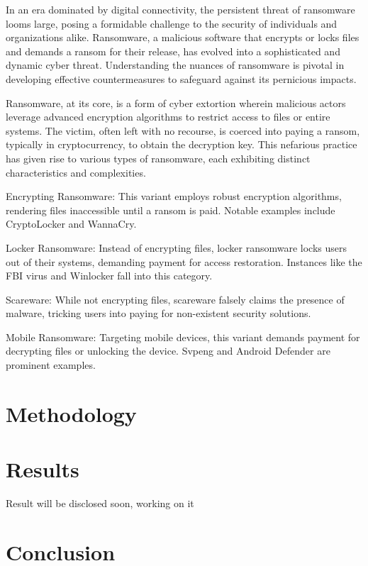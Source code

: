 \documentclass[12pt,twocolumn]{article}
\begin{document}
    In an era dominated by digital connectivity, the persistent threat of ransomware looms large, posing a formidable challenge to the security of individuals and organizations alike. Ransomware, a malicious software that encrypts or locks files and demands a ransom for their release, has evolved into a sophisticated and dynamic cyber threat. Understanding the nuances of ransomware is pivotal in developing effective countermeasures to safeguard against its pernicious impacts.

    Ransomware, at its core, is a form of cyber extortion wherein malicious actors leverage advanced encryption algorithms to restrict access to files or entire systems. The victim, often left with no recourse, is coerced into paying a ransom, typically in cryptocurrency, to obtain the decryption key. This nefarious practice has given rise to various types of ransomware, each exhibiting distinct characteristics and complexities.
    
    {Encrypting Ransomware:} This variant employs robust encryption algorithms, rendering files inaccessible until a ransom is paid. Notable examples include CryptoLocker and WannaCry.

    {Locker Ransomware:} Instead of encrypting files, locker ransomware locks users out of their systems, demanding payment for access restoration. Instances like the FBI virus and Winlocker fall into this category.

    {Scareware:} While not encrypting files, scareware falsely claims the presence of malware, tricking users into paying for non-existent security solutions.

    {Mobile Ransomware:} Targeting mobile devices, this variant demands payment for decrypting files or unlocking the device. Svpeng and Android Defender are prominent examples.

\section{Methodology}
\lipsum[9-12] %

\section{Results}
Result will be disclosed soon, working on it

\section{Conclusion}
\lipsum[21-22] %



\twocolumn[
    \printbibliography
]
\end{document}
